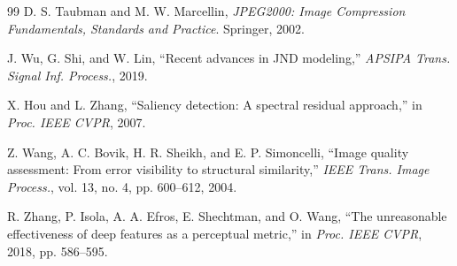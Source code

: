 \documentclass[conference]{IEEEtran}
\begin{document}
\begin{thebibliography}{99}
D. S. Taubman and M. W. Marcellin, \textit{JPEG2000: Image Compression Fundamentals, Standards and Practice}. Springer, 2002.

J. Wu, G. Shi, and W. Lin, ``Recent advances in JND modeling,'' \textit{APSIPA Trans. Signal Inf. Process.}, 2019.

X. Hou and L. Zhang, ``Saliency detection: A spectral residual approach,'' in \textit{Proc. IEEE CVPR}, 2007.

Z. Wang, A. C. Bovik, H. R. Sheikh, and E. P. Simoncelli, ``Image quality assessment: From error visibility to structural similarity,'' \textit{IEEE Trans. Image Process.}, vol. 13, no. 4, pp. 600--612, 2004.

R. Zhang, P. Isola, A. A. Efros, E. Shechtman, and O. Wang, ``The unreasonable effectiveness of deep features as a perceptual metric,'' in \textit{Proc. IEEE CVPR}, 2018, pp. 586--595.

\end{thebibliography}
\end{document}
